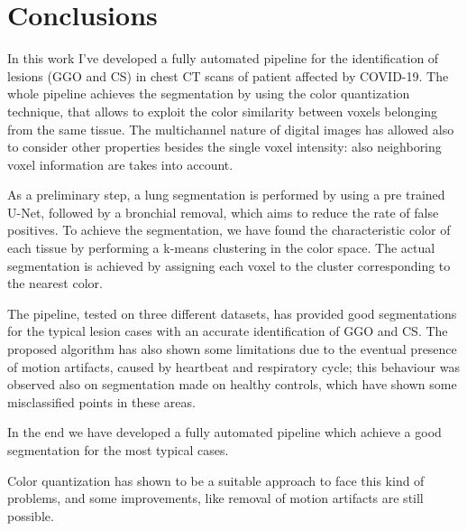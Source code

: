 \documentclass{standalone}
\begin{document}
\chapter*{Conclusions}

In this work I've developed a fully automated pipeline for the identification of lesions (GGO and CS) in chest CT scans of patient affected by COVID-19.
The whole pipeline achieves the segmentation by using the color quantization technique, that allows to exploit the color similarity between voxels belonging from the same tissue.  The multichannel nature of digital images has allowed also to consider other properties besides the single voxel intensity: also neighboring voxel information are takes into account.

As a preliminary step, a lung segmentation is performed by using a pre trained U-Net, followed by a bronchial removal, which aims to reduce the rate of false positives.
To achieve the segmentation, we have found the characteristic color of each tissue by performing a k-means clustering in the color space.  The actual segmentation is achieved by assigning each voxel to the cluster corresponding to the nearest color.
 

The pipeline, tested on three different datasets, has provided good segmentations for the typical lesion cases with an accurate identification of GGO and CS. The proposed algorithm has also shown some limitations due to the eventual presence of motion artifacts, caused by heartbeat and respiratory cycle; this behaviour was observed also on segmentation made on healthy controls, which have shown some misclassified points in these areas.

In the end we have developed a fully automated pipeline which achieve a good segmentation for the most typical cases. 

Color quantization has shown to be a suitable approach to face this kind of problems, and some improvements, like removal of motion artifacts are still possible.
\end{document}
